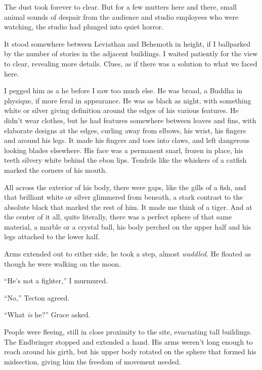 The dust took forever to clear.  But for a few mutters here and there, small animal sounds of despair from the audience and studio employees who were watching, the studio had plunged into quiet horror.



It stood somewhere between Leviathan and Behemoth in height, if I ballparked by the number of stories in the adjacent buildings.  I waited patiently for the view to clear, revealing more details.  Clues, as if there was a solution to what we faced here.



I pegged him as a he before I saw too much else.  He was broad, a Buddha in physique, if more feral in appearance.  He was as black as night, with something white or silver giving definition around the edges of his various features.  He didn't wear clothes, but he had features somewhere between leaves and fins, with elaborate designs at the edges, curling away from elbows, his wrist, his fingers and around his legs. It made his fingers and toes into claws, and left dangerous looking blades elsewhere.  His face was a permanent snarl, frozen in place, his teeth silvery white behind the ebon lips.  Tendrils like the whiskers of a catfish marked the corners of his mouth.



All across the exterior of his body, there were gaps, like the gills of a fish, and that brilliant white or silver glimmered from beneath, a stark contrast to the absolute black that marked the rest of him.  It made me think of a tiger.  And at the center of it all, quite literally, there was a perfect sphere of that same material, a marble or a crystal ball, his body perched on the upper half and his legs attached to the lower half.



Arms extended out to either side, he took a step, almost \emph{waddled}.  He floated as though he were walking on the moon.



``He's not a fighter,'' I murmured.



``No,'' Tecton agreed.



``What \emph{is} he?'' Grace asked.



People were fleeing, still in close proximity to the site, evacuating tall buildings.  The Endbringer stopped and extended a hand.  His arms weren't long enough to reach around his girth, but his upper body rotated on the sphere that formed his midsection, giving him the freedom of movement needed.



